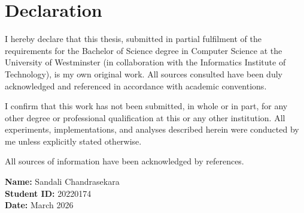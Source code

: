 \chapter*{Declaration}
\setlength{\parindent}{0pt}

I hereby declare that this thesis, submitted in partial fulfilment of the requirements for the Bachelor of Science degree in Computer Science at the University of Westminster (in collaboration with the Informatics Institute of Technology), is my own original work. All sources consulted have been duly acknowledged and referenced in accordance with academic conventions.

I confirm that this work has not been submitted, in whole or in part, for any other degree or professional qualification at this or any other institution. All experiments, implementations, and analyses described herein were conducted by me unless explicitly stated otherwise.

\vspace{1em}

All sources of information have been acknowledged by references.

\vspace{3em}

\textbf{Name:} Sandali Chandrasekara \\
\textbf{Student ID:} 20220174 \\
\textbf{Date:} March 2026